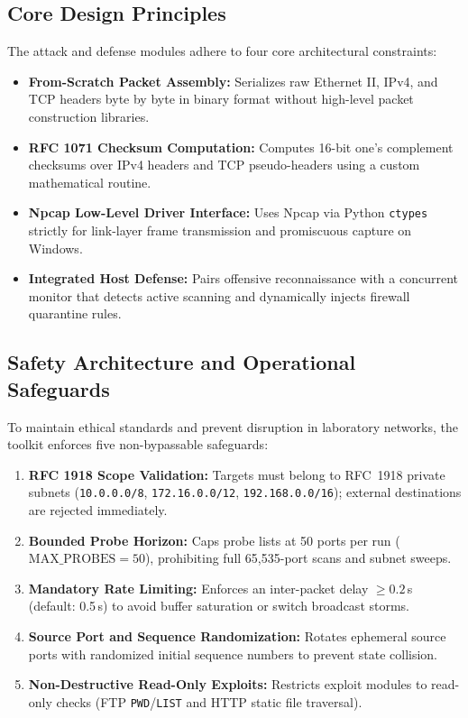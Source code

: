 \documentclass[11pt,a4paper]{article}
\begin{document}
\subsection{Core Design Principles}
The attack and defense modules adhere to four core architectural constraints:
\begin{itemize}[nosep, itemsep=1pt, leftmargin=1.5em]
    \item \textbf{From-Scratch Packet Assembly:} Serializes raw Ethernet II, IPv4, and TCP headers byte by byte in binary format without high-level packet construction libraries.
    \item \textbf{RFC 1071 Checksum Computation:} Computes 16-bit one's complement checksums over IPv4 headers and TCP pseudo-headers using a custom mathematical routine.
    \item \textbf{Npcap Low-Level Driver Interface:} Uses Npcap via Python \texttt{ctypes} strictly for link-layer frame transmission and promiscuous capture on Windows.
    \item \textbf{Integrated Host Defense:} Pairs offensive reconnaissance with a concurrent monitor that detects active scanning and dynamically injects firewall quarantine rules.
\end{itemize}
\vspace{-2pt}

\subsection{Safety Architecture and Operational Safeguards}
To maintain ethical standards and prevent disruption in laboratory networks, the toolkit enforces five non-bypassable safeguards:
\begin{enumerate}[nosep, itemsep=1pt, leftmargin=1.5em]
    \item \textbf{RFC 1918 Scope Validation:} Targets must belong to RFC~1918 private subnets (\texttt{10.0.0.0/8}, \texttt{172.16.0.0/12}, \texttt{192.168.0.0/16}); external destinations are rejected immediately.
    \item \textbf{Bounded Probe Horizon:} Caps probe lists at 50 ports per run ($\text{MAX\_PROBES} = 50$), prohibiting full 65,535-port scans and subnet sweeps.
    \item \textbf{Mandatory Rate Limiting:} Enforces an inter-packet delay $\ge 0.2$\,s (default: 0.5\,s) to avoid buffer saturation or switch broadcast storms.
    \item \textbf{Source Port and Sequence Randomization:} Rotates ephemeral source ports with randomized initial sequence numbers to prevent state collision.
    \item \textbf{Non-Destructive Read-Only Exploits:} Restricts exploit modules to read-only checks (FTP \texttt{PWD}/\texttt{LIST} and HTTP static file traversal).
\end{enumerate}
\end{document}
